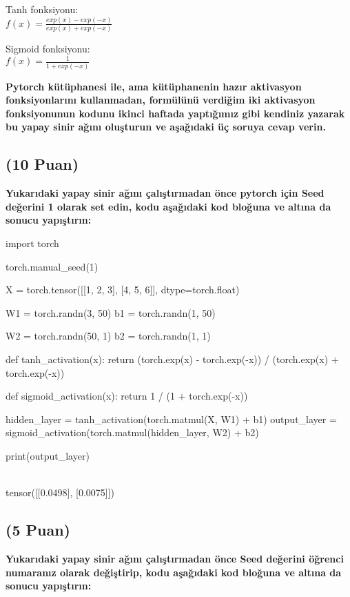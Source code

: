 \documentclass[11pt]{article}
\begin{document}
Tanh fonksiyonu:\\
$f(x) = \frac{exp(x) - exp(-x)}{exp(x) + exp(-x)}$
\vspace{.2in}

Sigmoid fonksiyonu:\\
$f(x) = \frac{1}{1 + exp(-x)}$

\vspace{.2in}
 \textbf{Pytorch kütüphanesi ile, ama kütüphanenin hazır aktivasyon fonksiyonlarını kullanmadan, formülünü verdiğim iki aktivasyon fonksiyonunun kodunu ikinci haftada yaptığımız gibi kendiniz yazarak bu yapay sinir ağını oluşturun ve aşağıdaki üç soruya cevap verin.}
 
\subsection{(10 Puan)} \textbf{Yukarıdaki yapay sinir ağını çalıştırmadan önce pytorch için Seed değerini 1 olarak set edin, kodu aşağıdaki kod bloğuna ve altına da sonucu yapıştırın:}

\begin{python}

import torch

torch.manual_seed(1)

X = torch.tensor([[1, 2, 3], [4, 5, 6]], dtype=torch.float)

W1 = torch.randn(3, 50)
b1 = torch.randn(1, 50)

W2 = torch.randn(50, 1)
b2 = torch.randn(1, 1)

def tanh_activation(x):
    return (torch.exp(x) - torch.exp(-x)) / (torch.exp(x) + torch.exp(-x))

def sigmoid_activation(x):
    return 1 / (1 + torch.exp(-x))

hidden_layer = tanh_activation(torch.matmul(X, W1) + b1)
output_layer = sigmoid_activation(torch.matmul(hidden_layer, W2) + b2)

print(output_layer)

\end{python}

\textbf\\tensor([[0.0498],
        [0.0075]])


\subsection{(5 Puan)} \textbf{Yukarıdaki yapay sinir ağını çalıştırmadan önce Seed değerini öğrenci numaranız olarak değiştirip, kodu aşağıdaki kod bloğuna ve altına da sonucu yapıştırın:}
\end{document}
